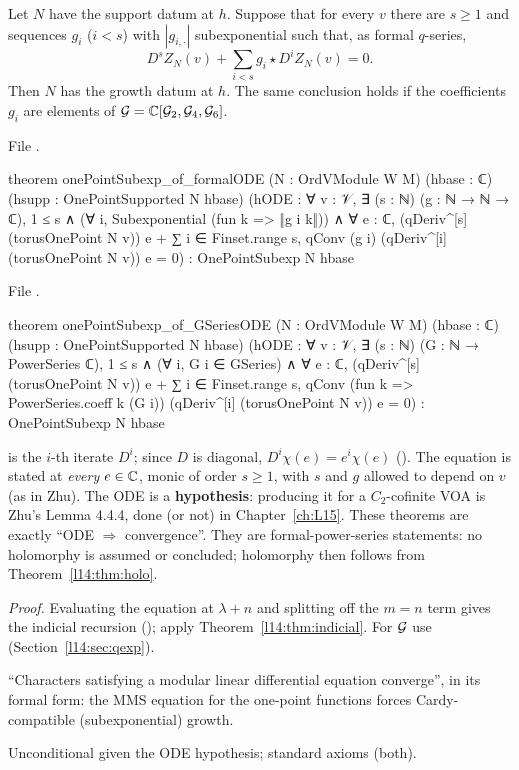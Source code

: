 \begin{theorem}\label{l14:thm:formalODE}
Let $N$ have the support datum at $h$. Suppose that for every $v$ there are $s\ge1$ and sequences $g_i$ ($i<s$) with
$|g_{i,\cdot}|$ subexponential such that, as formal $q$-series,
\begin{equation*}
  D^sZ_N(v) + \sum_{i<s}g_i\star D^iZ_N(v) = 0 .
\end{equation*}
Then $N$ has the growth datum at $h$. The same conclusion holds if the coefficients $g_i$ are elements of $\mathcal{G} =
{\mathbb{C}}[\mathcal G_2,\mathcal G_4,\mathcal G_6]$.
\end{theorem}
\noindent File .
\begin{leancode}
theorem onePointSubexp_of_formalODE (N : OrdVModule W M) (hbase : ℂ)
    (hsupp : OnePointSupported N hbase)
    (hODE : ∀ v : 𝒱, ∃ (s : ℕ) (g : ℕ → ℕ → ℂ), 1 ≤ s ∧
      (∀ i, Subexponential (fun k => ‖g i k‖)) ∧
      ∀ e : ℂ, (qDeriv^[s] (torusOnePoint N v)) e
        + ∑ i ∈ Finset.range s, qConv (g i) (qDeriv^[i] (torusOnePoint N v)) e = 0) :
    OnePointSubexp N hbase
\end{leancode}
\noindent File .
\begin{leancode}
theorem onePointSubexp_of_GSeriesODE (N : OrdVModule W M) (hbase : ℂ)
    (hsupp : OnePointSupported N hbase)
    (hODE : ∀ v : 𝒱, ∃ (s : ℕ) (G : ℕ → PowerSeries ℂ), 1 ≤ s ∧
      (∀ i, G i ∈ GSeries) ∧
      ∀ e : ℂ, (qDeriv^[s] (torusOnePoint N v)) e
        + ∑ i ∈ Finset.range s,
            qConv (fun k => PowerSeries.coeff k (G i)) (qDeriv^[i] (torusOnePoint N v)) e = 0) :
    OnePointSubexp N hbase
\end{leancode}
\begin{dictionary}
 is the $i$-th iterate $D^i$; since $D$ is diagonal, $D^i\chi(e) = e^i\chi(e)$ ().
The equation is stated at \emph{every} $e\in{\mathbb{C}}$, monic of order $s\ge1$, with $s$ and $g$ allowed to depend on $v$ (as in
Zhu). The ODE is a \textbf{hypothesis}: producing it for a $C_2$-cofinite VOA is Zhu's Lemma 4.4.4, done (or not) in
Chapter~\ref{ch:L15}. These theorems are exactly ``ODE $\Rightarrow$ convergence''. They are formal-power-series statements:
no holomorphy is assumed or concluded; holomorphy then follows from Theorem~\ref{l14:thm:holo}.
\end{dictionary}
\noindent\emph{Proof.} Evaluating the equation at $\lambda+n$ and splitting off the $m=n$ term gives the indicial recursion
(); apply Theorem~\ref{l14:thm:indicial}. For $\mathcal{G}$ use
 (Section~\ref{l14:sec:qexp}).
\begin{physics}
``Characters satisfying a modular linear differential equation converge'', in its formal form: the MMS equation for the
one-point functions forces Cardy-compatible (subexponential) growth.
\end{physics}
\begin{status}
Unconditional given the ODE hypothesis; standard axioms (both).
\end{status}

